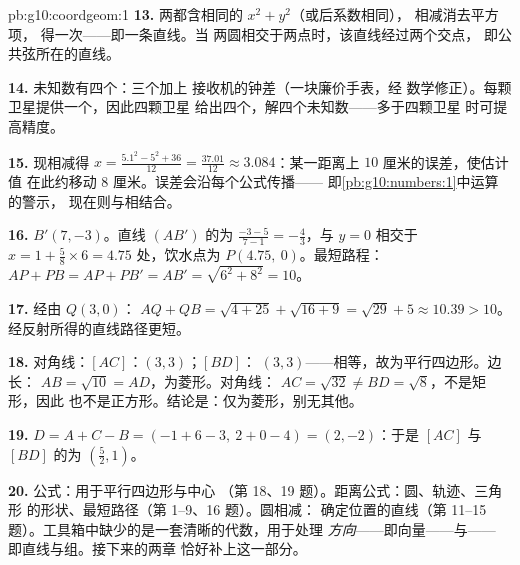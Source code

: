 \begin{solution}{pb:g10:coordgeom:1}
\textbf{13.} 两都含相同的 $x^2 + y^2$（或后系数相同），
相减消去平方项，
得一次——即一条直线。当
两圆相交于两点时，该直线经过两个交点，
即公共弦所在的直线。

\textbf{14.} 未知数有四个：三个加上
接收机的钟差（一块廉价手表，经
数学修正）。每颗卫星提供一个，因此四颗卫星
给出四个，解四个未知数——多于四颗卫星
时可提高精度。

\textbf{15.} 现相减得
$x = \frac{5.1^2 - 5^2 + 36}{12} = \frac{37.01}{12} \approx
3.084$：某一距离上 $10$ 厘米的误差，使估计值
在此约移动 $8$ 厘米。误差会沿每个公式传播——
即\cref{pb:g10:numbers:1}中运算的警示，
现在则与相结合。

\textbf{16.} $B' (7, -3)$。直线 $(AB')$ 的为
$\frac{-3 - 5}{7 - 1} = -\frac43$，与 $y = 0$ 相交于
$x = 1 + \frac{5}{8} \times 6 = 4.75$ 处，饮水点为
$P(4.75,\ 0)$。最短路程：$AP + PB = AP + PB' = AB' =
\sqrt{6^2 + 8^2} = 10$。

\textbf{17.} 经由 $Q(3, 0)$：
$AQ + QB = \sqrt{4 + 25} + \sqrt{16 + 9} = \sqrt{29} + 5
\approx 10.39 > 10$。经反射所得的直线路径更短。

\textbf{18.} 对角线：$[AC]$：$(3, 3)$；$[BD]$：
$(3, 3)$——相等，故为平行四边形。边长：
$AB = \sqrt{10} = AD$，为菱形。对角线：
$AC = \sqrt{32} \neq BD = \sqrt{8}$，不是矩形，因此
也不是正方形。结论是：仅为菱形，别无其他。

\textbf{19.} $D = A + C - B = (-1 + 6 - 3,\ 2 + 0 - 4) =
(2, -2)$：于是 $[AC]$ 与 $[BD]$ 的为
$\left(\frac52, 1\right)$。

\textbf{20.} 公式：用于平行四边形与中心
（第 18、19 题）。距离公式：圆、轨迹、三角形
的形状、最短路径（第 1--9、16 题）。圆相减：
确定位置的直线（第
11--15 题）。工具箱中缺少的是一套清晰的代数，用于处理
\emph{方向}——即向量——与\emph{}——
即直线与组。接下来的两章
恰好补上这一部分。
\end{solution}
